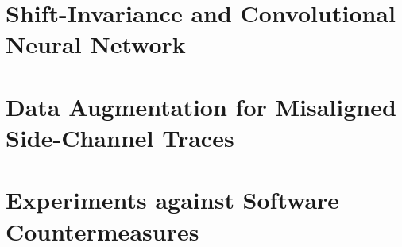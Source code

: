 



\section{Shift-Invariance and Convolutional Neural Network}


\section{Data Augmentation for Misaligned Side-Channel Traces}

\section{Experiments against Software Countermeasures}



